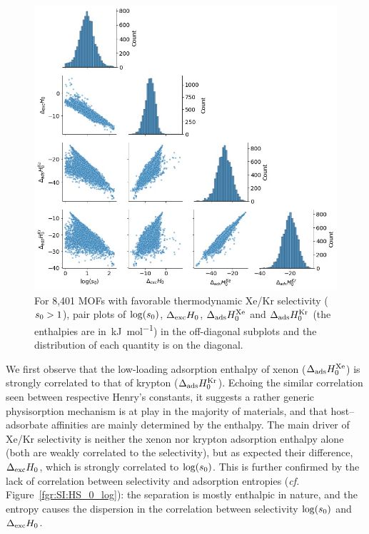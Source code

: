 \documentclass[main.tex]{subfiles}
\begin{document}
\begin{figure}[t]
\centering
  \includegraphics[width=0.7\linewidth]{figures/2-thermo/Enthalpy_0_log.jpg}
  \caption{For 8,401 MOFs with favorable thermodynamic Xe/Kr selectivity ($s_{\text{0}} > 1$), pair plots of $\log(s_{\text{0}})$, $\Delta_{\text{exc}}H_{\text{0}}$, $\Delta_{\text{ads}}H^{\text{Xe}}_{\text{0}}$ and $\Delta_{\text{ads}}H^{\text{Kr}}_{\text{0}}$ (the enthalpies are in~\si{\kilo\joule\per\mol}) in the off-diagonal subplots and the distribution of each quantity is on the diagonal.}\label{fgr:histo_H}
\end{figure}

We first observe that the low-loading adsorption enthalpy of xenon ($\Delta_{\text{ads}}H^{\text{Xe}}_{\text{0}}$) is strongly correlated to that of krypton ($\Delta_{\text{ads}}H^{\text{Kr}}_{\text{0}}$). Echoing the similar correlation seen between respective Henry's constants, it suggests a rather generic physisorption mechanism is at play in the majority of materials, and that host--adsorbate affinities are mainly determined by the enthalpy. The main driver of Xe/Kr selectivity is neither the xenon nor krypton adsorption enthalpy alone (both are weakly correlated to the selectivity), but as expected their difference, $\Delta_{\text{exc}}H_{\text{0}}$, which is strongly correlated to $\log(s_{\text{0}})$. This is further confirmed by the lack of correlation between selectivity and adsorption entropies (\emph{cf.} Figure~\ref{fgr:SI:HS_0_log}): the separation is mostly enthalpic in nature, and the entropy causes the dispersion in the correlation between selectivity $\log(s_{\text{0}})$ and $\Delta_{\text{exc}}H_{\text{0}}$.
\end{document}

